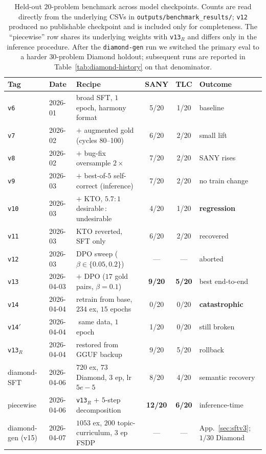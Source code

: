 \documentclass[11pt]{article}
\begin{document}
\begin{table}[t]
\centering
\small
\begin{tabular}{l l l c c l}
\toprule
Tag & Date & Recipe & SANY & TLC & Outcome \\
\midrule
\texttt{v6}    & 2026-01    & broad SFT, $1$ epoch, harmony format               & 5/20 & 1/20 & baseline \\
\texttt{v7}    & 2026-02    & $+$ augmented gold (cycles 80--100)                & 6/20 & 2/20 & small lift \\
\texttt{v8}    & 2026-02    & $+$ bug-fix oversample $2\!\times$                 & 7/20 & 2/20 & SANY rises \\
\texttt{v9}    & 2026-03    & $+$ best-of-$5$ self-correct (inference)           & 7/20 & 2/20 & no train change \\
\texttt{v10}   & 2026-03    & $+$ KTO, $5.7\!:\!1$ desirable\,:\,undesirable     & 4/20 & 1/20 & \textbf{regression} \\
\texttt{v11}   & 2026-03    & KTO reverted, SFT only                             & 6/20 & 2/20 & recovered \\
\texttt{v12}   & 2026-03    & DPO sweep ($\beta\!\in\!\{0.05,0.2\}$)             & ---  & ---  & aborted \\
\texttt{v13}   & 2026-04-03 & $+$ DPO ($17$ gold pairs, $\beta=0.1$)             & \textbf{9/20} & \textbf{5/20} & best end-to-end \\
\texttt{v14}   & 2026-04-04 & retrain from base, $234$ ex, $15$ epochs           & 0/20 & 0/20 & \textbf{catastrophic} \\
\texttt{v14}$'$ & 2026-04-04 & $\!\!$ same data, $1$ epoch                       & 1/20 & 0/20 & still broken \\
\texttt{v13}$_R$ & 2026-04-04 & restored from GGUF backup                        & 9/20 & 5/20 & rollback \\
\midrule
diamond-SFT    & 2026-04-06 & $720$ ex, $73$ Diamond, $3$ ep, lr $5e\!-\!5$      & 8/20 & 4/20 & semantic recovery \\
piecewise      & 2026-04-06 & \texttt{v13}$_R$ $+$ $5$-step decomposition        & \textbf{12/20} & \textbf{6/20} & inference-time \\
diamond-gen (v15) & 2026-04-07 & $1053$ ex, $200$ topic-curriculum, $3$ ep FSDP   & ---  & ---  & App.~\ref{sec:sftv3}; $1/30$ Diamond \\
\bottomrule
\end{tabular}
\caption{Held-out $20$-problem benchmark across model checkpoints.
Counts are read directly from the underlying CSVs in
\texttt{outputs/benchmark\_results/}; \texttt{v12} produced no
publishable checkpoint and is included only for completeness. The
``piecewise'' row shares its underlying weights with \texttt{v13}$_R$
and differs only in the inference procedure. After the
\texttt{diamond-gen} run we switched the primary eval to a harder
$30$-problem Diamond holdout; subsequent runs are reported in
Table~\ref{tab:diamond-history} on that denominator.}
\label{tab:run-history}
\end{table}
\end{document}
